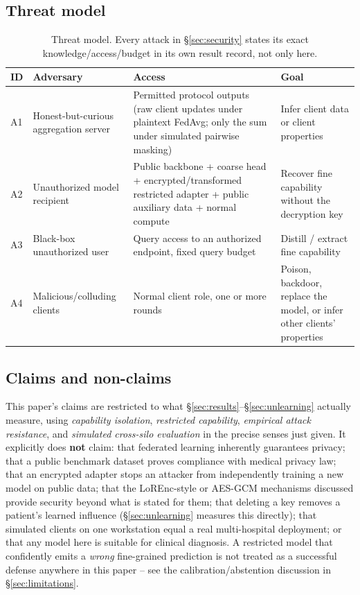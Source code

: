 \documentclass[11pt]{article}
\begin{document}
\subsection{Threat model}
\begin{table}[h]
\centering
\caption{Threat model. Every attack in \S\ref{sec:security} states its
exact knowledge/access/budget in its own result record, not only here.}
\label{tab:threat-model}
\begin{tabular}{p{1.3cm}p{3.6cm}p{5.4cm}p{4cm}}
\toprule
ID & Adversary & Access & Goal \\
\midrule
A1 & Honest-but-curious aggregation server & Permitted protocol outputs (raw client updates under plaintext FedAvg; only the sum under simulated pairwise masking) & Infer client data or client properties \\
A2 & Unauthorized model recipient & Public backbone + coarse head + encrypted/transformed restricted adapter + public auxiliary data + normal compute & Recover fine capability without the decryption key \\
A3 & Black-box unauthorized user & Query access to an authorized endpoint, fixed query budget & Distill / extract fine capability \\
A4 & Malicious/colluding clients & Normal client role, one or more rounds & Poison, backdoor, replace the model, or infer other clients' properties \\
\bottomrule
\end{tabular}
\end{table}

\subsection{Claims and non-claims}
This paper's claims are restricted to what \S\ref{sec:results}--\S\ref{sec:unlearning}
actually measure, using \emph{capability isolation}, \emph{restricted
capability}, \emph{empirical attack resistance}, and \emph{simulated
cross-silo evaluation} in the precise senses just given. It explicitly does
\textbf{not} claim: that federated learning inherently guarantees privacy;
that a public benchmark dataset proves compliance with medical privacy law;
that an encrypted adapter stops an attacker from independently training a
new model on public data; that the LoREnc-style or AES-GCM mechanisms
discussed provide security beyond what is stated for them; that deleting a
key removes a patient's learned influence (\S\ref{sec:unlearning} measures
this directly); that simulated clients on one workstation equal a real
multi-hospital deployment; or that any model here is suitable for clinical
diagnosis. A restricted model that confidently emits a \emph{wrong}
fine-grained prediction is not treated as a successful defense anywhere in
this paper -- see the calibration/abstention discussion in
\S\ref{sec:limitations}.
\end{document}
